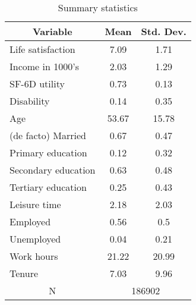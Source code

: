 
\begin{table}[htbp]\centering \caption{Summary statistics \label{descstat}}
\begin{tabular}{l c c  }\hline\hline
\multicolumn{1}{c}{\textbf{Variable}} & \textbf{Mean}
 & \textbf{Std. Dev.} \\ \hline
Life satisfaction & 7.09 & 1.71  \\
Income in 1000's & 2.03 & 1.29  \\
SF-6D utility & 0.73 & 0.13  \\
Disability & 0.14 & 0.35  \\
Age & 53.67 & 15.78  \\
(de facto) Married & 0.67 & 0.47  \\
Primary education & 0.12 & 0.32  \\
Secondary education & 0.63 & 0.48  \\
Tertiary education & 0.25 & 0.43  \\
Leisure time & 2.18 & 2.03  \\
Employed & 0.56 & 0.5  \\
Unemployed & 0.04 & 0.21  \\
Work hours & 21.22 & 20.99  \\
Tenure & 7.03 & 9.96  \\
\multicolumn{1}{c}{N} & \multicolumn{2}{c}{186902}\\ \hline\end{tabular}
\end{table}
